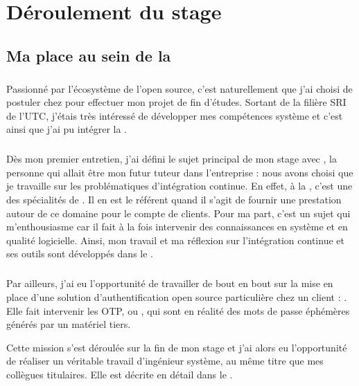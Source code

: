 \chapter{Déroulement du stage}

\section{Ma place au sein de la \abusys}

\paragraph{}
Passionné par l'écosystème de l'open source, c'est naturellement que j'ai choisi de postuler chez \asmile{} pour effectuer mon projet de fin d'études.
Sortant de la filière SRI de l'UTC, j'étais très intéressé de développer mes compétences système et c'est ainsi que j'ai pu intégrer la \abusys{}.

\paragraph{}
Dès mon premier entretien, j'ai défini le sujet principal de mon stage avec \agulet{}, la personne qui allait être mon futur tuteur dans l'entreprise : nous avons choisi que je travaille sur les problématiques d'intégration continue.
En effet, à la \abusys{}, c'est une des spécialités de \agulet{}.
Il en est le référent quand il s'agit de fournir une prestation autour de ce domaine pour le compte de clients.
Pour ma part, c'est un sujet qui m'enthousiasme car il fait à la fois intervenir des connaissances en système et en qualité logicielle.
Ainsi, mon travail et ma réflexion sur l'intégration continue et ses outils sont développés dans le .

\paragraph{}
Par ailleurs, j'ai eu l'opportunité de travailler de bout en bout sur la mise en place d'une solution d'authentification open source particulière chez un client : \alinotp.
Elle fait intervenir les OTP, ou , qui sont en réalité des mots de passe éphémères générés par un matériel tiers.

Cette mission s'est déroulée sur la fin de mon stage et j'ai alors eu l'opportunité de réaliser un véritable travail d'ingénieur système, au même titre que mes collègues titulaires.
Elle est décrite en détail dans le  .

